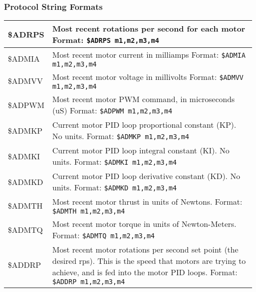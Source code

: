 \documentclass{article}
\numberwithin{equation}{section} %
\begin{document}
\subsubsection{Protocol String Formats}
\begin{tabular}{p{2cm}p{9cm}}

\hline
\$ADRPS &
	Most recent rotations per second for each motor \newline
	Format: \newline
	\texttt{\$ADRPS m1,m2,m3,m4} \\ 
\hline
\$ADMIA &
	Most recent motor current in milliamps \newline
	Format: \newline
	\texttt{\$ADMIA m1,m2,m3,m4} \\
\hline
\$ADMVV &
	Most recent motor voltage in millivolts \newline
	Format: \newline
	\texttt{\$ADMVV m1,m2,m3,m4} \\
\hline
\$ADPWM &
	Most recent motor PWM command, in microseconds (uS) \newline 
	Format:  \newline
	\texttt{\$ADPWM m1,m2,m3,m4} \\
\hline
\$ADMKP &
	Current motor PID loop proportional constant (KP). No units.  \newline
	Format:  \newline
	\texttt{\$ADMKP m1,m2,m3,m4} \\
\hline
\$ADMKI &
	Current motor PID loop integral constant (KI). No units.  \newline
	Format:  \newline
	\texttt{\$ADMKI m1,m2,m3,m4} \\
\hline
\$ADMKD &
	Current motor PID loop derivative constant (KD). No units.  \newline
	Format:  \newline
	\texttt{\$ADMKD m1,m2,m3,m4} \\
\hline
\$ADMTH &
	Most recent motor thrust in units of Newtons.  \newline
	Format:  \newline
	\texttt{\$ADMTH m1,m2,m3,m4} \\
\hline
\$ADMTQ &
	Most recent motor torque in units of Newton-Meters.  \newline
	Format:  \newline
	\texttt{\$ADMTQ m1,m2,m3,m4} \\
\hline
\$ADDRP &
	Most recent motor rotations per second set point (the desired rps). This is the speed that motors are trying to achieve, and is fed into the motor PID loops. 
	Format: 
	\texttt{\$ADDRP m1,m2,m3,m4} \\
\hline
\end{tabular}
\end{document}
